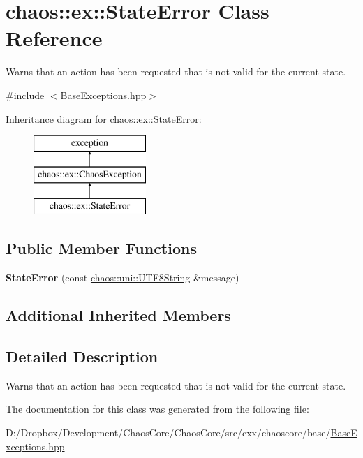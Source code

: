 \hypertarget{classchaos_1_1ex_1_1_state_error}{}\section{chaos\+:\+:ex\+:\+:State\+Error Class Reference}
\label{classchaos_1_1ex_1_1_state_error}


Warns that an action has been requested that is not valid for the current state.  




{\ttfamily \#include $<$Base\+Exceptions.\+hpp$>$}

Inheritance diagram for chaos\+:\+:ex\+:\+:State\+Error\+:\begin{figure}[H]
\begin{center}
\leavevmode
\includegraphics[height=3.000000cm]{classchaos_1_1ex_1_1_state_error}
\end{center}
\end{figure}
\subsection*{Public Member Functions}
\begin{DoxyCompactItemize}
\item 
\hypertarget{classchaos_1_1ex_1_1_state_error_abb2ed9dc030b7fbcb3c76a46d62da4ad}{}{\bfseries State\+Error} (const \hyperlink{classchaos_1_1uni_1_1_u_t_f8_string}{chaos\+::uni\+::\+U\+T\+F8\+String} \&message)\label{classchaos_1_1ex_1_1_state_error_abb2ed9dc030b7fbcb3c76a46d62da4ad}

\end{DoxyCompactItemize}
\subsection*{Additional Inherited Members}


\subsection{Detailed Description}
Warns that an action has been requested that is not valid for the current state. 

The documentation for this class was generated from the following file\+:\begin{DoxyCompactItemize}
\item 
D\+:/\+Dropbox/\+Development/\+Chaos\+Core/\+Chaos\+Core/src/cxx/chaoscore/base/\hyperlink{_base_exceptions_8hpp}{Base\+Exceptions.\+hpp}\end{DoxyCompactItemize}
